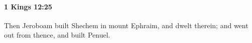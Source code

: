
		\paragraph{1 Kings 12:25} %
			\label{1KINGS-12-25}

			Then Jeroboam built Shechem in mount Ephraim, and dwelt therein; and went out from thence, and built Penuel.


